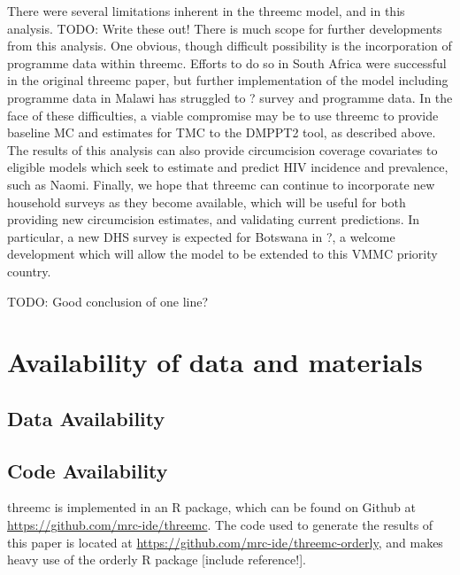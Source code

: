 \documentclass{article}
\begin{document}
There were several limitations inherent in the threemc model, and in this analysis. 
TODO: Write these out!
There is much scope for further developments from this analysis. 
One obvious, though difficult possibility is the incorporation of programme data within threemc. 
Efforts to do so in South Africa were successful in the original threemc paper, but further implementation of the model including programme data in Malawi has struggled to ? survey and programme data. 
In the face of these difficulties, a viable compromise may be to use threemc to provide baseline MC and estimates for TMC to the DMPPT2 tool, as described above. 
The results of this analysis can also provide circumcision coverage covariates to eligible models which seek to estimate and predict HIV incidence and prevalence, such as Naomi. 
Finally, we hope that threemc can continue to incorporate new household surveys as they become available, which will be useful for both providing new circumcision estimates, and validating current predictions. 
In particular, a new DHS survey is expected for Botswana in ?, a welcome development which will allow the model to be extended to this VMMC priority country. 

TODO: Good conclusion of one line?

\section{Availability of data and materials}
\label{sec:orgd999c87}
\subsection{Data Availability}
\label{sec:org953a659}
\subsection{Code Availability}
\label{sec:org2a96da6}
threemc is implemented in an R package, which can be found on Github at \url{https://github.com/mrc-ide/threemc}. The code used to generate the results of this paper is located at \url{https://github.com/mrc-ide/threemc-orderly}, and makes heavy use of the orderly R package [include reference!].
\end{document}
